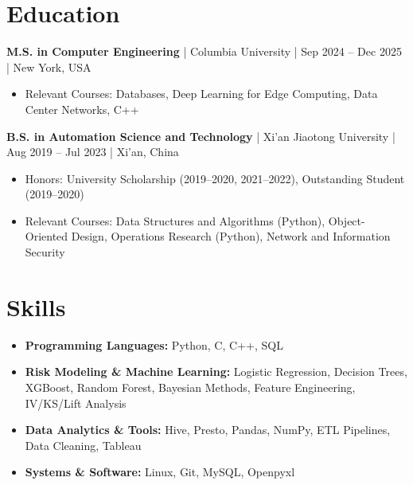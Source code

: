 \documentclass[11pt,letterpaper]{article}
\begin{document}
\section{Education}
\textbf{M.S. in Computer Engineering} | Columbia University | Sep 2024 – Dec 2025 | New York, USA
\begin{itemize}[leftmargin=*, topsep=0pt, itemsep=1pt]
\item Relevant Courses: Databases, Deep Learning for Edge Computing, Data Center Networks, C++
\end{itemize}

\textbf{B.S. in Automation Science and Technology} | Xi'an Jiaotong University | Aug 2019 – Jul 2023 | Xi'an, China
\begin{itemize}[leftmargin=*, topsep=0pt, itemsep=1pt]
\item Honors: University Scholarship (2019–2020, 2021–2022), Outstanding Student (2019–2020)
\item Relevant Courses: Data Structures and Algorithms (Python), Object-Oriented Design, Operations Research (Python), Network and Information Security
\end{itemize}

\section{Skills}
\begin{itemize}[leftmargin=*, topsep=0pt, itemsep=1pt]
\item \textbf{Programming Languages:} Python, C, C++, SQL
\item \textbf{Risk Modeling \& Machine Learning:} Logistic Regression, Decision Trees, XGBoost, Random Forest, Bayesian Methods, Feature Engineering, IV/KS/Lift Analysis
\item \textbf{Data Analytics \& Tools:} Hive, Presto, Pandas, NumPy, ETL Pipelines, Data Cleaning, Tableau
\item \textbf{Systems \& Software:} Linux, Git, MySQL, Openpyxl
\end{itemize}
\end{document}
